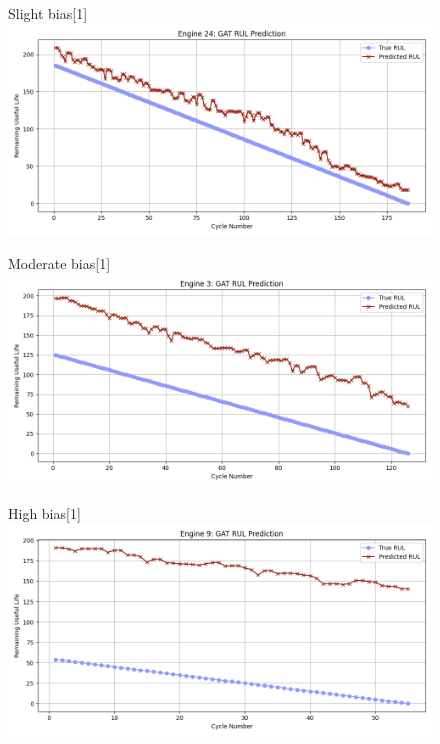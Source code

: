\documentclass[12pt]{article}
\begin{document}
\begin{figure}[H]
\begin{minipage}[t]{0.48\textwidth}
        \begin{subcaptionbox}{Slight bias\label{fig_NASA_GAT_eng4}}[1\linewidth]
            {\includegraphics[width=\linewidth]{figures/NASA/NASA_GAT_eng6.png}}
        \end{subcaptionbox}

        \vspace{0.1cm}

        \begin{subcaptionbox}{Moderate bias\label{fig_NASA_GAT_eng2}}[1\linewidth]
            {\includegraphics[width=\linewidth]{figures/NASA/NASA_GAT_eng1.png}}
        \end{subcaptionbox}

        \vspace{0.1cm}

        \begin{subcaptionbox}{High bias\label{fig_NASA_GAT_eng3}}[1\linewidth]
            {\includegraphics[width=\linewidth]{figures/NASA/NASA_GAT_eng3.png}}
        \end{subcaptionbox}


\end{minipage}
\end{figure}
\end{document}
